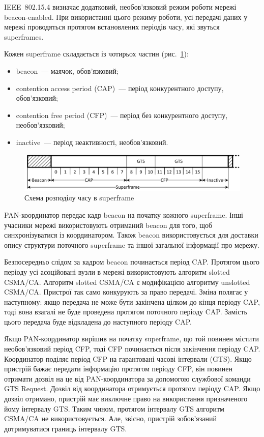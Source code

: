 \documentclass[a4paper,ukrainian,utf8,nocolumnsxix,nocolumnxxxii,nocolumnxxxi,floatsection,equationsection]{eskdtext}
\newcommand{\figref}[1]{рис.~\ref{#1}}
\newcommand{\iee}[0]{IEEE~802.15.4\xspace}
\newcommand{\csma}[0]{CSMA/CA\xspace}
\newcommand{\ucsma}[0]{unslotted \csma{}\xspace}
\newcommand{\scsma}[0]{slotted \csma{}\xspace}
\newcommand{\bem}[0]{beacon-enabled\xspace}
\begin{document}
\iee визначає додатковий, необов'язковий режим роботи мережі \bem. При використанні цього режиму роботи, усі передачі даних у мережі проводяться протягом встановлених періодів часу, які звуться superframes. 

Кожен superframe складається із чотирьох частин (\figref{fig:superframe}):

\begin{itemize}
	\item beacon~--- маячок, обов'язковий;
	\item contention access period (CAP)~--- період конкурентного доступу, обов'язковий;
	\item contention free period (CFP)~--- період без конкурентного доступу, необов'язковий;
	\item inactive~--- період неактивності, необов'язковий.
\end{itemize}

\begin{figure}[htbp]
	\centering
	\includegraphics[width=\textwidth]{img/superframe.pdf}
	\caption{\label{fig:superframe}Схема розподілу часу в superframe}
\end{figure}

PAN-координатор передає кадр beacon на початку кожного superframe. Інші учасники мережі використовують отриманий beacon для того, щоб синхронізуватися із координатором. Також beacon використовується для доставки опису структури поточного superframe та іншої загальної інформації про мережу. 

Безпосередньо слідом за кадром beacon починається період CAP. Протягом цього періоду усі асоційовані вузли в мережі використовують алгоритм \scsma. Алгоритм \scsma є модифікацією алгоритму \ucsma. Пристрої так само конкурують за право передачі. Зміна полягає у наступному: якщо передача не може бути закінчена цілком до кінця періоду CAP, тоді вона взагалі не буде проведена протягом поточного періоду CAP. Замість цього передача буде відкладена до наступного періоду CAP. 

Якщо PAN-координатор вирішив на початку superframe, що той повинен містити необов'язковий період CFP, тоді CFP починається після закінчення періоду CAP. Координатор поділяє період CFP на гарантовані часові інтервали (GTS). Якщо пристрій бажає передати інформацію протягом періоду CFP, він повинен отримати дозвіл на це від PAN-координатора за допомогою службової команди GTS Request. Дозвіл від координатора отримується протягом періоду CAP. Якщо дозвіл отримано, пристрій має виключне право на використання призначеного йому інтервалу GTS. Таким чином, протягом інтервалу GTS алгоритм \csma не використовується. Але, звісно, пристрій зобов'язаний дотримуватися границь інтервалу GTS. 
\end{document}
